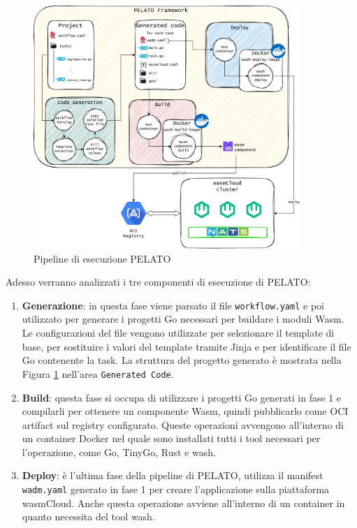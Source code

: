 \FloatBarrier
\begin{figure}[h]
    \centering
    \includegraphics[width=0.9\textwidth]{img/schemi/schemi-arch-pipeline.drawio.pdf}
    \caption{Pipeline di esecuzione PELATO}
    \label{fig:pelato_pipeline}
\end{figure}
\FloatBarrier

Adesso verranno analizzati i tre componenti di esecuzione di PELATO:
\begin{enumerate}
    \item \textbf{Generazione}: in questa fase viene parsato il file \texttt{workflow.yaml} e poi utilizzato per generare i progetti Go necessari per buildare i moduli Wasm. Le configurazioni del file vengono utilizzate per selezionare il template di base, per sostituire i valori del template tramite Jinja e per identificare il file Go contenente la task. La struttura del progetto generato è mostrata nella Figura \ref{fig:pelato_pipeline} nell'area \texttt{Generated Code}.
    
    \item \textbf{Build}: questa fase si occupa di utilizzare i progetti Go generati in fase 1 e compilarli per ottenere un componente Wasm, quindi pubblicarlo come OCI artifact sul registry configurato. Queste operazioni avvengono all'interno di un container Docker nel quale sono installati tutti i tool necessari per l'operazione, come Go, TinyGo, Rust e wash.

    \item \textbf{Deploy}: è l'ultima fase della pipeline di PELATO, utilizza il manifest \texttt{wadm.yaml} generato in fase 1 per creare l'applicazione sulla piattaforma wasmCloud. Anche questa operazione avviene all'interno di un container in quanto necessita del tool wash.
\end{enumerate}


